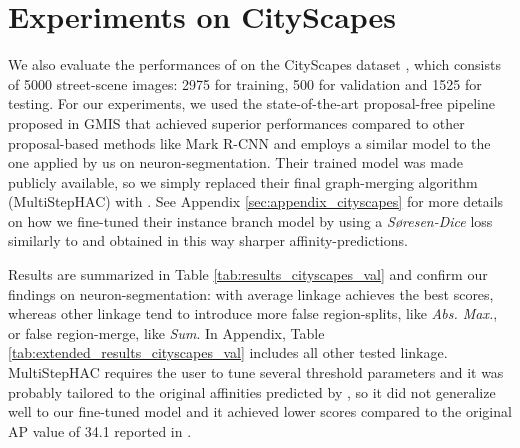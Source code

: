 \section{Experiments on CityScapes}\label{sec:cityscapes_exp}
We also evaluate the performances of \algname{} on the CityScapes dataset \cite{cordts2016cityscapes}, which consists of 5000 street-scene images: 2975 for training, 500 for validation and 1525 for testing.
For our experiments, we used the state-of-the-art proposal-free pipeline proposed in GMIS \cite{liu2018affinity} that achieved superior performances compared to other proposal-based methods like Mark R-CNN and employs a similar model to the one applied by us on neuron-segmentation.
Their trained model was made publicly available, so we simply replaced their final graph-merging algorithm (MultiStepHAC) with \algname{}. See Appendix \ref{sec:appendix_cityscapes} for more details on how we fine-tuned their instance branch model by using a \emph{S\o resen-Dice} loss similarly to \cite{wolf2018mutex} and obtained in this way sharper affinity-predictions.

Results are summarized in Table \ref{tab:results_cityscapes_val} and confirm our findings on neuron-segmentation: \algname{} with average linkage achieves the best scores, whereas other linkage tend to introduce more false region-splits, like \emph{Abs. Max.}, or false region-merge, like \emph{Sum}. In Appendix, Table \ref{tab:extended_results_cityscapes_val} includes all other tested linkage. MultiStepHAC requires the user to tune several threshold parameters and it was probably tailored to the original affinities predicted by \cite{liu2018affinity}, so it did not generalize well to our fine-tuned model and it achieved lower scores compared to the original AP value of 34.1 reported in \cite{liu2018affinity}.  


